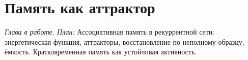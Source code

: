 \chapter{Память как аттрактор}
\label{sec:memory}

\emph{Глава в работе. План:} Ассоциативная память в рекуррентной сети: энергетическая функция, аттракторы, восстановление по неполному образцу, ёмкость. Кратковременная память как устойчивая активность.
